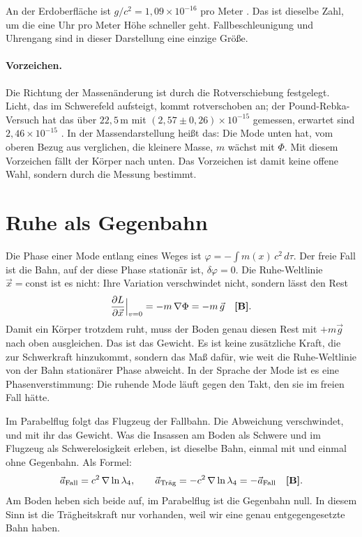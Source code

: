 An der Erdoberfläche ist $g/c^2=1{,}09\times10^{-16}$ pro Meter \KM. Das ist dieselbe Zahl, um die
eine Uhr pro Meter Höhe schneller geht. Fallbeschleunigung und Uhrengang sind in dieser
Darstellung eine einzige Größe.

\paragraph{Vorzeichen.} Die Richtung der Massenänderung ist durch die Rotverschiebung festgelegt.
Licht, das im Schwerefeld aufsteigt, kommt rotverschoben an; der Pound-Rebka-Versuch hat das über
$22{,}5$\,m mit $(2{,}57\pm0{,}26)\times10^{-15}$ gemessen, erwartet sind $2{,}46\times10^{-15}$
\KM. In der Massendarstellung heißt das: Die Mode unten hat, vom oberen Bezug aus verglichen, die
kleinere Masse, $m$ wächst mit $\Phi$. Mit diesem Vorzeichen fällt der Körper nach unten. Das
Vorzeichen ist damit keine offene Wahl, sondern durch die Messung bestimmt.

\section{Ruhe als Gegenbahn}

Die Phase einer Mode entlang eines Weges ist $\varphi=-\int m(x)\,c^2\,d\tau$. Der freie Fall ist
die Bahn, auf der diese Phase stationär ist, $\delta\varphi=0$. Die Ruhe-Weltlinie
$\vec x=\text{const}$ ist es nicht: Ihre Variation verschwindet nicht, sondern lässt den Rest
\begin{equation}
\frac{\partial L}{\partial \vec x}\Big|_{v=0}=-m\,\nabla\Phi=-m\,\vec g\quad\textbf{[B]}.
\end{equation}
Damit ein Körper trotzdem ruht, muss der Boden genau diesen Rest mit $+m\vec g$ nach oben
ausgleichen. Das ist das Gewicht. Es ist keine zusätzliche Kraft, die zur Schwerkraft hinzukommt,
sondern das Maß dafür, wie weit die Ruhe-Weltlinie von der Bahn stationärer Phase abweicht. In
der Sprache der Mode ist es eine Phasenverstimmung: Die ruhende Mode läuft gegen den Takt, den sie
im freien Fall hätte.

Im Parabelflug folgt das Flugzeug der Fallbahn. Die Abweichung verschwindet, und mit ihr das
Gewicht. Was die Insassen am Boden als Schwere und im Flugzeug als Schwerelosigkeit erleben, ist
dieselbe Bahn, einmal mit und einmal ohne Gegenbahn. Als Formel:
\begin{equation}
\vec a_{\text{Fall}}=c^2\,\nabla\ln\lambda_4,\qquad
\vec a_{\text{Träg}}=-c^2\,\nabla\ln\lambda_4=-\vec a_{\text{Fall}}\quad\textbf{[B]}.
\end{equation}
Am Boden heben sich beide auf, im Parabelflug ist die Gegenbahn null. In diesem Sinn ist die
Trägheitskraft nur vorhanden, weil wir eine genau entgegengesetzte Bahn haben.

